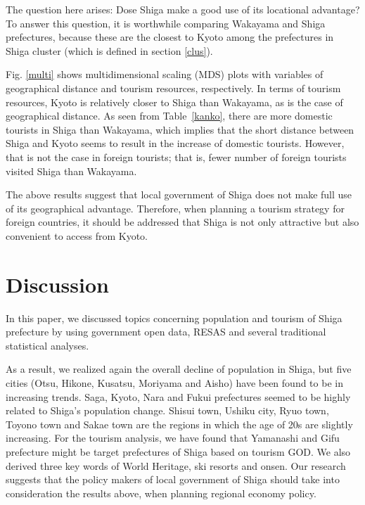 \documentclass[10pt, conference, compsocconf]{IEEEtran}
\begin{document}
The question here arises: Dose Shiga make a good use of its locational advantage?
To answer this question, it is worthwhile comparing Wakayama and Shiga prefectures, 
because these are the closest to Kyoto among the 
prefectures in Shiga cluster (which is defined in section \ref{clus}). 


Fig. \ref{multi} shows multidimensional scaling (MDS) plots with variables of geographical distance and tourism resources, respectively.
In terms of tourism resources, Kyoto is relatively closer to Shiga than Wakayama, as is the case of geographical distance. As seen from Table~\ref{kanko}, there are more domestic tourists in Shiga than Wakayama,
which implies that the short distance between Shiga and Kyoto seems to 
result in the increase of domestic tourists.
However, that is not the case in foreign tourists; that is, 
fewer number of foreign tourists visited Shiga than Wakayama.

The above results suggest that local government of Shiga does not make full use of its geographical advantage. 
Therefore, when planning a tourism strategy for foreign countries, 
it should be addressed that Shiga is not only attractive but also convenient to access from Kyoto. 

\section{Discussion}\label{sec:discuss}
In this paper, we discussed topics concerning population and tourism of Shiga prefecture by using government open data, RESAS and several traditional statistical analyses. 

As a result, we realized again the overall decline of population in Shiga, but five cities (Otsu, Hikone, Kusatsu, Moriyama and Aisho) have been found to be in increasing trends. Saga, Kyoto, Nara and Fukui prefectures seemed to be highly related to Shiga's population change. Shisui town, Ushiku city, Ryuo town, Toyono town and Sakae town are the regions in which the age of 20s are slightly increasing. 
For the tourism analysis, we have found that Yamanashi and Gifu prefecture might be target prefectures of Shiga based on tourism GOD. We also derived three key words of World Heritage, ski resorts and onsen.  
Our research suggests that the policy makers of local government of Shiga should take into consideration the results above, when planning regional economy policy.
\end{document}
